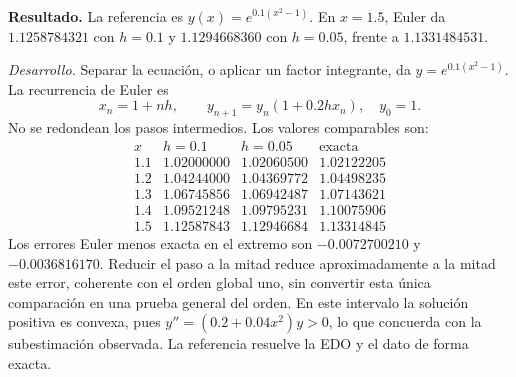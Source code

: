 \noindent\textbf{Resultado.} La referencia es $y(x)=e^{0.1(x^2-1)}$. En $x=1.5$, Euler da $1.1258784321$ con $h=0.1$ y $1.1294668360$ con $h=0.05$, frente a $1.1331484531$.

\noindent\textit{Desarrollo.} Separar la ecuación, o aplicar un factor integrante, da $y=e^{0.1(x^2-1)}$. La recurrencia de Euler es
\[x_n=1+nh,\qquad y_{n+1}=y_n(1+0.2hx_n),\quad y_0=1.\]
No se redondean los pasos intermedios. Los valores comparables son:
\[\begin{array}{c|rrr}x&h=0.1&h=0.05&\text{exacta}\\\hline
1.1&1.02000000&1.02060500&1.02122205\\
1.2&1.04244000&1.04369772&1.04498235\\
1.3&1.06745856&1.06942487&1.07143621\\
1.4&1.09521248&1.09795231&1.10075906\\
1.5&1.12587843&1.12946684&1.13314845
\end{array}\]
Los errores Euler menos exacta en el extremo son $-0.0072700210$ y $-0.0036816170$. Reducir el paso a la mitad reduce aproximadamente a la mitad este error, coherente con el orden global uno, sin convertir esta única comparación en una prueba general del orden. En este intervalo la solución positiva es convexa, pues $y''=(0.2+0.04x^2)y>0$, lo que concuerda con la subestimación observada. La referencia resuelve la EDO y el dato de forma exacta.
